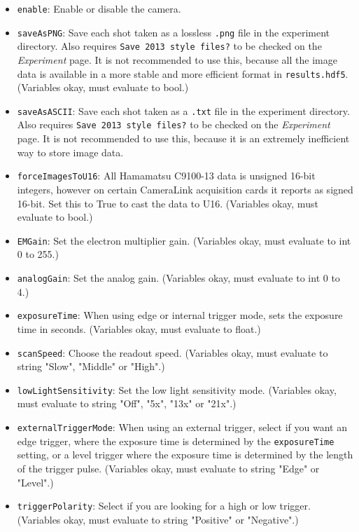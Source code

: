 \documentclass[pdftex,11pt,letterpaper]{article}
\begin{document}
\begin{itemize}
\item \texttt{enable}:  Enable or disable the camera.
\item \texttt{saveAsPNG}:  Save each shot taken as a lossless \texttt{.png} file in the experiment directory.  Also requires \texttt{Save 2013 style files?} to be checked on the \textit{Experiment} page.  It is not recommended to use this, because all the image data is available in a more stable and more efficient format in \texttt{results.hdf5}.  (Variables okay, must evaluate to bool.)
\item \texttt{saveAsASCII}:  Save each shot taken as a \texttt{.txt} file in the experiment directory.  Also requires \texttt{Save 2013 style files?} to be checked on the \textit{Experiment} page.  It is not recommended to use this, because it is an extremely inefficient way to store image data.
\item \texttt{forceImagesToU16}:  All Hamamatsu C9100-13 data is unsigned 16-bit integers, however on certain CameraLink acquisition cards it reports as signed 16-bit.  Set this to True to cast the data to U16.  (Variables okay, must evaluate to bool.)
\item \texttt{EMGain}:  Set the electron multiplier gain.  (Variables okay, must evaluate to int 0 to 255.)
\item \texttt{analogGain}:  Set the analog gain. (Variables okay, must evaluate to int 0 to 4.)
\item \texttt{exposureTime}:  When using edge or internal trigger mode, sets the exposure time in seconds. (Variables okay, must evaluate to float.)
\item \texttt{scanSpeed}:  Choose the readout speed.  (Variables okay, must evaluate to string "Slow", "Middle" or "High".)
\item \texttt{lowLightSensitivity}:  Set the low light sensitivity mode.  (Variables okay, must evaluate to string "Off", "5x", "13x" or "21x".)
\item \texttt{externalTriggerMode}:  When using an external trigger, select if you want an edge trigger, where the exposure time is determined by the \texttt{exposureTime} setting, or a level trigger where the exposure time is determined by the length of the trigger pulse.  (Variables okay, must evaluate to string "Edge" or "Level".)
\item \texttt{triggerPolarity}:  Select if you are looking for a high or low trigger.  (Variables okay, must evaluate to string "Positive" or "Negative".)

\end{itemize}
\end{document}
